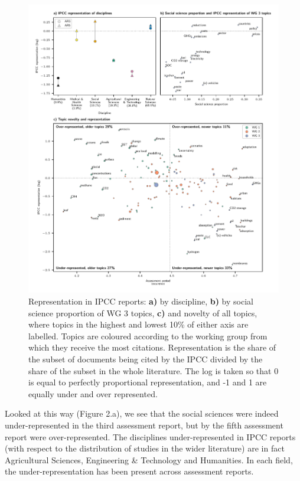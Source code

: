 \documentclass{article}
\begin{document}
\begin{linenumbers}
\begin{figure}[htp]
	\begin{center}
		\includegraphics[width=180mm]{plots_pub/big_panel_representation.pdf}
		\caption{Representation in IPCC reports: \textbf{a)} by discipline, \textbf{b)} by social science proportion of WG 3 topics, \textbf{c)} and novelty of all topics, where topics in the highest and lowest 10\% of either axis are labelled. Topics are coloured according to the working group from which they receive the most citations. Representation is the share of the subset of documents being cited by the IPCC divided by the share of the subset in the whole literature. The log is taken so that 0 is equal to perfectly proportional representation, and -1 and 1 are equally under and over represented.}
		\label{oecd_rep}
	\end{center}
\end{figure}


Looked at this way (Figure 2.a), we see that the social sciences were indeed under-represented in the third assessment report, but by the fifth assessment report were over-represented. The disciplines under-represented in IPCC reports (with respect to the distribution of studies in the wider literature) are in fact Agricultural Sciences, Engineering \& Technology and Humanities. In each field, the under-representation has been present across assessment reports.



\end{linenumbers}
\end{document}
